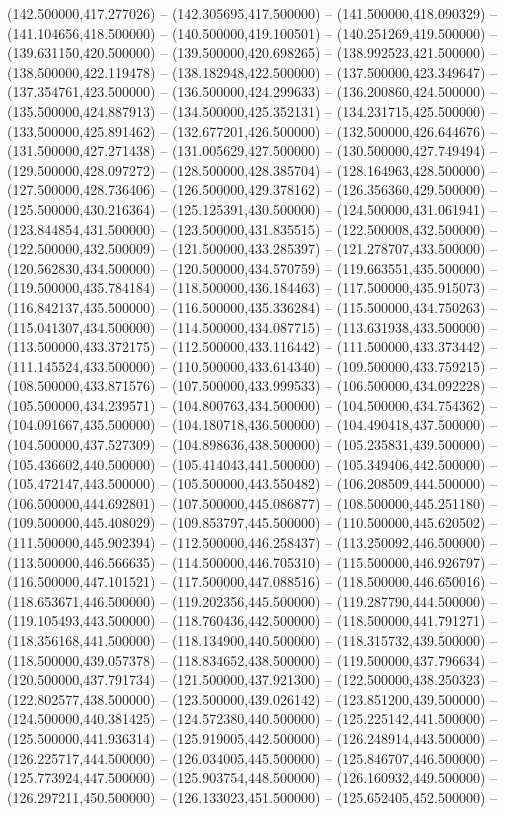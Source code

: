 (142.500000,417.277026) -- (142.305695,417.500000) -- (141.500000,418.090329) -- (141.104656,418.500000) -- (140.500000,419.100501) -- (140.251269,419.500000) -- (139.631150,420.500000) -- (139.500000,420.698265) -- (138.992523,421.500000) -- (138.500000,422.119478) -- (138.182948,422.500000) -- (137.500000,423.349647) -- (137.354761,423.500000) -- (136.500000,424.299633) -- (136.200860,424.500000) -- (135.500000,424.887913) -- (134.500000,425.352131) -- (134.231715,425.500000) -- (133.500000,425.891462) -- (132.677201,426.500000) -- (132.500000,426.644676) -- (131.500000,427.271438) -- (131.005629,427.500000) -- (130.500000,427.749494) -- (129.500000,428.097272) -- (128.500000,428.385704) -- (128.164963,428.500000) -- (127.500000,428.736406) -- (126.500000,429.378162) -- (126.356360,429.500000) -- (125.500000,430.216364) -- (125.125391,430.500000) -- (124.500000,431.061941) -- (123.844854,431.500000) -- (123.500000,431.835515) -- (122.500008,432.500000) -- (122.500000,432.500009) -- (121.500000,433.285397) -- (121.278707,433.500000) -- (120.562830,434.500000) -- (120.500000,434.570759) -- (119.663551,435.500000) -- (119.500000,435.784184) -- (118.500000,436.184463) -- (117.500000,435.915073) -- (116.842137,435.500000) -- (116.500000,435.336284) -- (115.500000,434.750263) -- (115.041307,434.500000) -- (114.500000,434.087715) -- (113.631938,433.500000) -- (113.500000,433.372175) -- (112.500000,433.116442) -- (111.500000,433.373442) -- (111.145524,433.500000) -- (110.500000,433.614340) -- (109.500000,433.759215) -- (108.500000,433.871576) -- (107.500000,433.999533) -- (106.500000,434.092228) -- (105.500000,434.239571) -- (104.800763,434.500000) -- (104.500000,434.754362) -- (104.091667,435.500000) -- (104.180718,436.500000) -- (104.490418,437.500000) -- (104.500000,437.527309) -- (104.898636,438.500000) -- (105.235831,439.500000) -- (105.436602,440.500000) -- (105.414043,441.500000) -- (105.349406,442.500000) -- (105.472147,443.500000) -- (105.500000,443.550482) -- (106.208509,444.500000) -- (106.500000,444.692801) -- (107.500000,445.086877) -- (108.500000,445.251180) -- (109.500000,445.408029) -- (109.853797,445.500000) -- (110.500000,445.620502) -- (111.500000,445.902394) -- (112.500000,446.258437) -- (113.250092,446.500000) -- (113.500000,446.566635) -- (114.500000,446.705310) -- (115.500000,446.926797) -- (116.500000,447.101521) -- (117.500000,447.088516) -- (118.500000,446.650016) -- (118.653671,446.500000) -- (119.202356,445.500000) -- (119.287790,444.500000) -- (119.105493,443.500000) -- (118.760436,442.500000) -- (118.500000,441.791271) -- (118.356168,441.500000) -- (118.134900,440.500000) -- (118.315732,439.500000) -- (118.500000,439.057378) -- (118.834652,438.500000) -- (119.500000,437.796634) -- (120.500000,437.791734) -- (121.500000,437.921300) -- (122.500000,438.250323) -- (122.802577,438.500000) -- (123.500000,439.026142) -- (123.851200,439.500000) -- (124.500000,440.381425) -- (124.572380,440.500000) -- (125.225142,441.500000) -- (125.500000,441.936314) -- (125.919005,442.500000) -- (126.248914,443.500000) -- (126.225717,444.500000) -- (126.034005,445.500000) -- (125.846707,446.500000) -- (125.773924,447.500000) -- (125.903754,448.500000) -- (126.160932,449.500000) -- (126.297211,450.500000) -- (126.133023,451.500000) -- (125.652405,452.500000) -- 